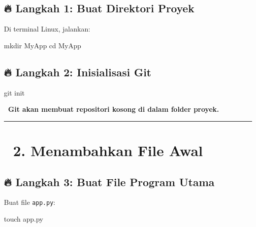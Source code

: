 \documentclass[
  letterpaper,
  DIV=11,
  numbers=noendperiod]{scrreprt}
\newenvironment{Shaded}{\begin{snugshade}}{\end{snugshade}}
\newcommand{\BuiltInTok}[1]{\textcolor[rgb]{0.00,0.23,0.31}{#1}}
\newcommand{\FunctionTok}[1]{\textcolor[rgb]{0.28,0.35,0.67}{#1}}
\newcommand{\NormalTok}[1]{\textcolor[rgb]{0.00,0.23,0.31}{#1}}
\begin{document}
\subsection{\texorpdfstring{🔥 \textbf{Langkah 1: Buat Direktori
Proyek}}{🔥 Langkah 1: Buat Direktori Proyek}}\label{langkah-1-buat-direktori-proyek}

Di terminal Linux, jalankan:

\begin{Shaded}
\begin{Highlighting}[]
\FunctionTok{mkdir}\NormalTok{ MyApp}
\BuiltInTok{cd}\NormalTok{ MyApp}
\end{Highlighting}
\end{Shaded}

\subsection{\texorpdfstring{🔥 \textbf{Langkah 2: Inisialisasi
Git}}{🔥 Langkah 2: Inisialisasi Git}}\label{langkah-2-inisialisasi-git}

\begin{Shaded}
\begin{Highlighting}[]
\FunctionTok{git}\NormalTok{ init}
\end{Highlighting}
\end{Shaded}

📌 \textbf{Git akan membuat repositori kosong di dalam folder proyek.}

\begin{center}\rule{0.5\linewidth}{0.5pt}\end{center}

\section{\texorpdfstring{🔹 \textbf{2. Menambahkan File
Awal}}{🔹 2. Menambahkan File Awal}}\label{menambahkan-file-awal}

\subsection{\texorpdfstring{🔥 \textbf{Langkah 3: Buat File Program
Utama}}{🔥 Langkah 3: Buat File Program Utama}}\label{langkah-3-buat-file-program-utama}

Buat file \texttt{app.py}:

\begin{Shaded}
\begin{Highlighting}[]
\FunctionTok{touch}\NormalTok{ app.py}
\end{Highlighting}
\end{Shaded}
\end{document}
